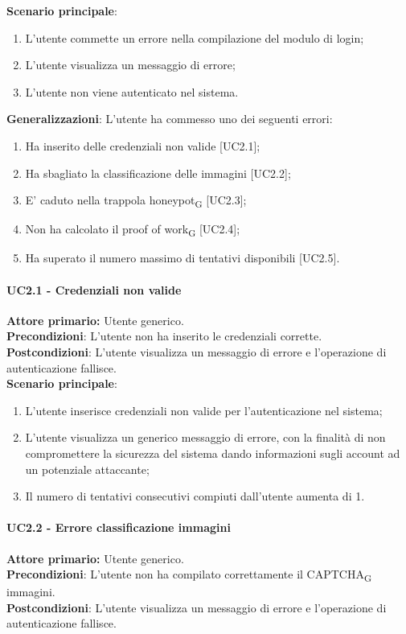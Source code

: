 \textbf{Scenario principale}:
\begin{enumerate}
   \item L’utente commette un errore nella compilazione del modulo di login;
   \item L'utente visualizza un messaggio di errore;
   \item L'utente non viene autenticato nel sistema.
\end{enumerate}

\textbf{Generalizzazioni}: L'utente ha commesso uno dei seguenti errori:
\begin{enumerate}
	\item Ha inserito delle credenziali non valide [UC2.1];
	\item Ha sbagliato la classificazione delle immagini [UC2.2];
	\item E' caduto nella trappola honeypot\textsubscript{G} [UC2.3];
	\item Non ha calcolato il proof of work\textsubscript{G} [UC2.4];
	\item Ha superato il numero massimo di tentativi disponibili [UC2.5].
\end{enumerate}

\paragraph{UC2.1 - Credenziali non valide}
\textbf{Attore primario:} Utente generico.\\
\textbf{Precondizioni}: L’utente non ha inserito le credenziali corrette.\\
\textbf{Postcondizioni}: L’utente visualizza un messaggio di errore e l’operazione di autenticazione fallisce.\\

\textbf{Scenario principale}:
\begin{enumerate}
    \item L'utente inserisce credenziali non valide per l'autenticazione nel sistema;
	\item L’utente visualizza un generico messaggio di errore, con la finalità di non compromettere la sicurezza del sistema dando informazioni sugli account ad un potenziale attaccante;
	\item Il numero di tentativi consecutivi compiuti dall’utente aumenta di 1.
\end{enumerate}

\paragraph{UC2.2 - Errore classificazione immagini}
\textbf{Attore primario:} Utente generico.\\
    \textbf{Precondizioni}: L’utente non ha compilato correttamente il CAPTCHA\textsubscript{G} immagini.\\
\textbf{Postcondizioni}: L’utente visualizza un messaggio di errore e l’operazione di autenticazione fallisce.\\


